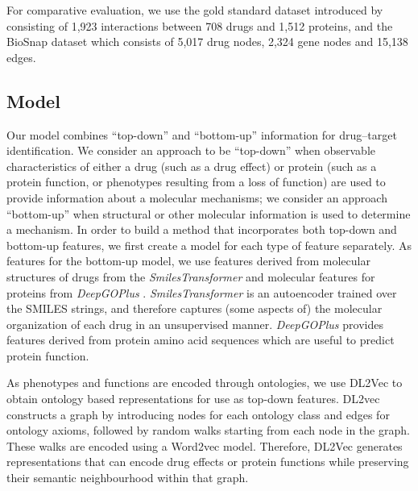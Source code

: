 \documentclass{bioinfo}
\renewcommand{\cite}{\citep}
\begin{document}
For comparative evaluation, we use the gold standard dataset
introduced by \citet{Yaminishi2008} consisting of 1,923 interactions
between 708 drugs and 1,512 proteins, and the BioSnap dataset
\cite{BioSnap2018} which consists of 5,017 drug nodes, 2,324 gene
nodes and 15,138 edges.
 
\subsection{Model}

Our model combines ``top-down'' and ``bottom-up'' information for
drug--target identification. We consider an approach to be
``top-down'' when observable characteristics of either a drug (such as
a drug effect) or protein (such as a protein function, or phenotypes
resulting from a loss of function) are used to provide information
about a molecular mechanisms; we consider an approach ``bottom-up''
when structural or other molecular information is used to determine a
mechanism.  In order to build a method that incorporates both top-down
and bottom-up features, we first create a model for each type of
feature separately.  As features for the bottom-up model, we use
features derived from molecular structures of drugs from the
\textit{SmilesTransformer} \citep{SmilesTransformer} and molecular
features for proteins from \textit{DeepGOPlus}
\citep{DeepGoPlus}. \textit{SmilesTransformer} is an autoencoder
trained over the SMILES strings, and therefore captures (some aspects
of) the molecular organization of each drug in an unsupervised manner.
\textit{DeepGOPlus} provides features derived from protein amino acid
sequences which are useful to predict protein function.

As phenotypes and functions are encoded through ontologies, we use
DL2Vec \citep{DL2vec2020} to obtain ontology based representations for
use as top-down features. DL2vec constructs a graph by introducing
nodes for each ontology class and edges for ontology axioms, followed
by random walks starting from each node in the graph. These walks are
encoded using a Word2vec \citep{Word2vec2013} model. Therefore, DL2Vec
generates representations that can encode drug effects or protein
functions while preserving their semantic neighbourhood within that
graph.


\end{document}

